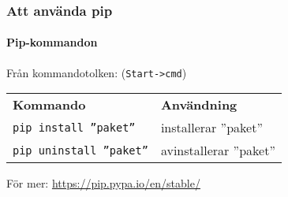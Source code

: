 \documentclass{beamer}
\begin{document}
\begin{frame}
\frametitle{Att använda pip}
\framesubtitle{Pip-kommandon}

Från kommandotolken: (\texttt{Start->cmd})

\begin{tabular}{ll}
\textbf{Kommando} 	& \textbf{Användning}\\
\texttt{pip install ''paket''} & installerar ''paket''\\
\texttt{pip uninstall ''paket''} & avinstallerar ''paket''
\end{tabular}

\vspace{1cm}

För mer: \url{https://pip.pypa.io/en/stable/}

\end{frame}
\end{document}
